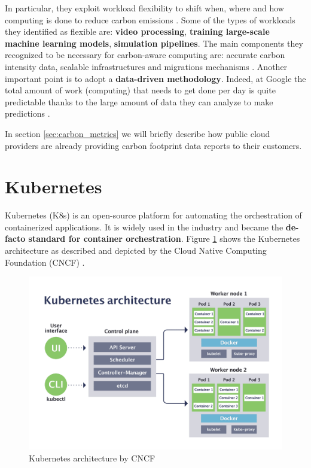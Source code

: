 In particular, they exploit workload flexibility to shift when, where and how computing is done to reduce carbon emissions \cite{google_carbon_aware_computing}.
Some of the types of workloads they identified as flexible are: \textbf{video processing}, \textbf{training large-scale machine learning models}, \textbf{simulation pipelines}.
The main components they recognized to be necessary for carbon-aware computing are: accurate carbon intensity data, scalable infrastructures and migrations mechanisms \cite{google_carbon_aware_computing}.
Another important point is to adopt a \textbf{data-driven methodology}.
Indeed, at Google the total amount of work (computing) that needs to get done per day is quite predictable thanks to the large amount of data they can analyze to make predictions \cite{google_carbon_aware_computing}.

In section \ref{sec:carbon_metrics} we will briefly describe how public cloud providers are already providing carbon footprint data reports to their customers.

\section{Kubernetes}

Kubernetes (K8s) is an open-source platform for automating the orchestration of containerized applications.
It is widely used in the industry and became the \textbf{de-facto standard for container orchestration}.
Figure \ref{fig:kubernetes_architecture} shows the Kubernetes architecture as described and depicted by the Cloud Native Computing Foundation (CNCF) \cite{kubernetes_cnfc}.

\begin{figure}[t]
    \centering
    \includegraphics[width=1\linewidth]{images/kubernetes-architecture-diagram.png}
    \caption{Kubernetes architecture by CNCF \cite{kubernetes_cnfc}}
    \label{fig:kubernetes_architecture}
\end{figure}

